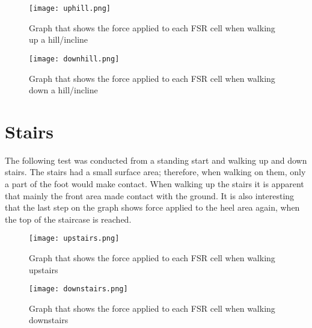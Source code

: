 \begin{figure}[!htb]
    \centering
    \texttt{[image: uphill.png]}
    \caption{Graph that shows the force applied to each FSR cell when walking up a hill/incline}
    \label{fig:uphill}
\end{figure}

\begin{figure}[!htb]
    \centering
    \texttt{[image: downhill.png]}
    \caption{Graph that shows the force applied to each FSR cell when walking down a hill/incline}
    \label{fig:downhill}
\end{figure}

\clearpage
\section{Stairs}
The following test was conducted from a standing start and walking up and down stairs. The stairs had a small surface area; therefore, when walking on them, only a part of the foot would make contact. When walking up the stairs it is apparent that mainly the front area made contact with the ground. It is also interesting that the last step on the graph shows force applied to the heel area again, when the top of the staircase is reached.
\label{sec:stairs}
\begin{figure}[!htb]
    \centering
    \texttt{[image: upstairs.png]}
    \caption{Graph that shows the force applied to each FSR cell when walking upstairs}
    \label{fig:upstairs}
\end{figure}
\begin{figure}[!htb]
    \centering
    \texttt{[image: downstairs.png]}
    \caption{Graph that shows the force applied to each FSR cell when walking downstairs}
    \label{fig:downstairs}
\end{figure}




